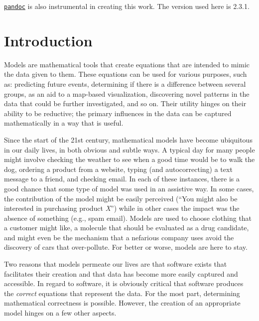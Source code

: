 \documentclass[11pt]{book}
\begin{document}
\href{https://pandoc.org/}{\texttt{pandoc}} is also instrumental in creating this work. The version used here is 2.3.1.

\hypertarget{introduction}{%
\chapter{Introduction}\label{introduction}}

Models are mathematical tools that create equations that are intended to mimic the data given to them. These equations can be used for various purposes, such as: predicting future events, determining if there is a difference between several groups, as an aid to a map-based visualization, discovering novel patterns in the data that could be further investigated, and so on. Their utility hinges on their ability to be reductive; the primary influences in the data can be captured mathematically in a way that is useful.

Since the start of the 21st century, mathematical models have become ubiquitous in our daily lives, in both obvious and subtle ways. A typical day for many people might involve checking the weather to see when a good time would be to walk the dog, ordering a product from a website, typing (and autocorrecting) a text message to a friend, and checking email. In each of these instances, there is a good chance that some type of model was used in an assistive way. In some cases, the contribution of the model might be easily perceived (``You might also be interested in purchasing product \emph{X}'') while in other cases the impact was the absence of something (e.g., spam email). Models are used to choose clothing that a customer might like, a molecule that should be evaluated as a drug candidate, and might even be the mechanism that a nefarious company uses avoid the discovery of cars that over-pollute. For better or worse, models are here to stay.

Two reasons that models permeate our lives are that software exists that facilitates their creation and that data has become more easily captured and accessible. In regard to software, it is obviously critical that software produces the \emph{correct} equations that represent the data. For the most part, determining mathematical correctness is possible. However, the creation of an appropriate model hinges on a few other aspects.
\end{document}
